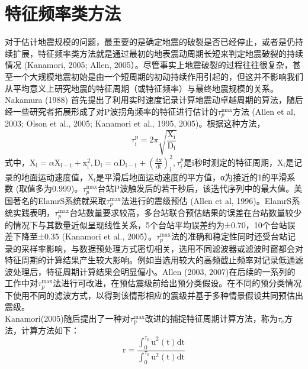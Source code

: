\section{特征频率类方法}
\indent 对于估计地震规模的问题，最重要的是确定地震的破裂是否已经停止，或者是仍持续扩展，特征频率类方法就是通过最初的地表震动周期长短来判定地震破裂的持续情况 (Kanamori, 2005; Allen, 2005）。尽管事实上地震破裂的过程往往很复杂，甚至一个大规模地震初始是由一个短周期的初动持续作用引起的，但这并不影响我们从平均意义上研究地震的特征周期（或特征频率）与最终地震规模的关系。\\
\indent Nakamura (1988) 首先提出了利用实时速度记录计算地震动卓越周期的算法，随后经一些研究者拓展形成了对P波拐角频率的特征进行估计的$\tau_{p}^{\max }$方法 (Allen et al, 2003; Olson et al., 2005; Kanamori et al., 1995, 2005)。根据这种方法，\\
\begin{equation}
\tau_{\mathrm{i}}^{\mathrm{p}}=2 \pi \sqrt{\frac{\mathrm{X}_{\mathrm{i}}}{\mathrm{D}_{\mathrm{i}}}}
\end{equation}
式中，$\mathrm{X}_{\mathrm{i}}=\alpha \mathrm{X}_{\mathrm{i}-1}+\mathrm{x}_{\mathrm{i}}^{2}, \mathrm{D}_{\mathrm{i}}=\alpha \mathrm{D}_{\mathrm{i}-1}+\left(\frac{\mathrm{dx}}{\mathrm{dt}}\right)_{\mathrm{i}}^{2}, \tau_{i}^{p}$是i秒时测定的特征周期，$\mathrm{X}_{\mathrm{i}}$是记录的地面运动速度值，$\mathrm{X}_{\mathrm{i}}$是平滑后地面运动速度的平方值，α为接近的1的平滑系数 (取值多为0.999)。$\tau_{p}^{\max}$台站P波触发后的若干秒后，该迭代序列中的最大值。美国著名的ElamrS系统就采取$\tau_{p}^{\max }$法进行的震级预估 (Allen et al, 1996)。ElamrS系统实践表明，$\tau_{p}^{\max}$台站数量要求较高，多台站联合预估结果的误差在台站数量较少的情况下与其数量近似呈现线性关系，5个台站平均误差约为±0.70，10个台站误差下降至±0.35 (Kanamori et al., 2005）。$\tau_{p}^{\max}$法的准确和稳定性同时还受台站记录的采样率影响，与数据预处理方式密切相关，选用不同滤波器或滤波时窗都会对特征周期的计算结果产生较大影响。例如当选用较大的高频截止频率对记录低通滤波处理后，特征周期计算结果会明显偏小。Allen (2003, 2007)在后续的一系列的工作中对$\tau_{p}^{\max}$法进行可改进，在预估震级前给出预分类假设。在不同的预分类情况下使用不同的滤波方式，以得到该情形相应的震级并基于多种情景假设共同预估出震级。\\
\indent Kanamori(2005)随后提出了一种对$\tau_{p}^{\max}$改进的捕捉特征周期计算方法，称为$\tau_{\mathrm{c}}$方法，计算方法如下：\\
\begin{equation}
\mathrm{r}=\frac{\int_{0}^{\tau_{0}} \dot{\mathrm{u}}^{2}(\mathrm{t}) \mathrm{dt}}{\int_{0}^{\tau_{0}} \mathrm{u}^{2}(\mathrm{t}) \mathrm{dt}}
\end{equation}
